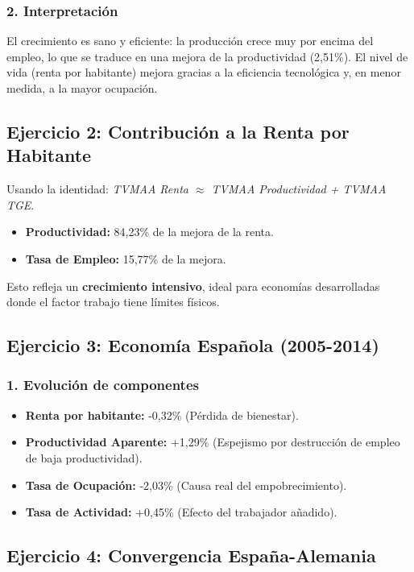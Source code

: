 \subsubsection{2. Interpretación}
El crecimiento es sano y eficiente: la producción crece muy por encima del empleo, lo que se traduce en una mejora de la productividad (2,51\%). El nivel de vida (renta por habitante) mejora gracias a la eficiencia tecnológica y, en menor medida, a la mayor ocupación.

\subsection{Ejercicio 2: Contribución a la Renta por Habitante}

Usando la identidad: \textit{TVMAA Renta $\approx$ TVMAA Productividad + TVMAA TGE}.
\begin{itemize}
    \item \textbf{Productividad:} 84,23\% de la mejora de la renta.
    \item \textbf{Tasa de Empleo:} 15,77\% de la mejora.
\end{itemize}
Esto refleja un \textbf{crecimiento intensivo}, ideal para economías desarrolladas donde el factor trabajo tiene límites físicos.

\subsection{Ejercicio 3: Economía Española (2005-2014)}

\subsubsection{1. Evolución de componentes}
\begin{itemize}
    \item \textbf{Renta por habitante:} -0,32\% (Pérdida de bienestar).
    \item \textbf{Productividad Aparente:} +1,29\% (Espejismo por destrucción de empleo de baja productividad).
    \item \textbf{Tasa de Ocupación:} -2,03\% (Causa real del empobrecimiento).
    \item \textbf{Tasa de Actividad:} +0,45\% (Efecto del trabajador añadido).
\end{itemize}

\subsection{Ejercicio 4: Convergencia España-Alemania}

